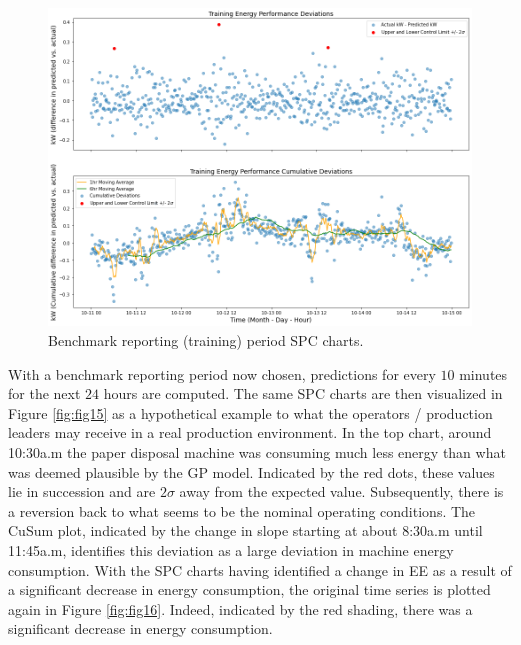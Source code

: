 \begin{figure}[h]
\centering
\graphicspath{ {./images/} }
\includegraphics[scale=0.49]{images/entsorgung_baseline_SPC.png}
\caption{Benchmark reporting (training) period SPC charts.}
\label{fig:fig14}
\end{figure}

With a benchmark reporting period now chosen, predictions for every $10$ minutes for the next $24$ hours are computed. The same SPC charts are then visualized in Figure \ref{fig:fig15} as a hypothetical example to what the operators / production leaders may receive in a real production environment. In the top chart, around 10:30a.m the paper disposal machine was consuming much less energy than what was deemed plausible by the GP model. Indicated by the red dots, these values lie in succession and are $2\sigma$ away from the expected value. Subsequently, there is a reversion back to what seems to be the nominal operating conditions. The CuSum plot, indicated by the change in slope starting at about 8:30a.m until 11:45a.m, identifies this deviation as a large deviation in machine energy consumption. With the SPC charts having identified a change in EE as a result of a significant decrease in energy consumption, the original time series is plotted again in Figure \ref{fig:fig16}. Indeed, indicated by the red shading, there was a significant decrease in energy consumption. 

